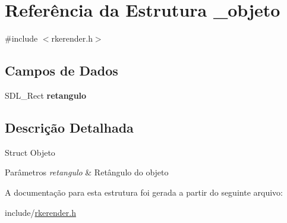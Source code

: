 \hypertarget{struct__objeto}{\section{Referência da Estrutura \-\_\-objeto}
\label{struct__objeto}
}


{\ttfamily \#include $<$rkerender.\-h$>$}

\subsection*{Campos de Dados}
\begin{DoxyCompactItemize}
\item 
\hypertarget{struct__objeto_a66706353d918fc22d4b7130ef5a9fbc4}{S\-D\-L\-\_\-\-Rect {\bfseries retangulo}}\label{struct__objeto_a66706353d918fc22d4b7130ef5a9fbc4}

\end{DoxyCompactItemize}


\subsection{Descrição Detalhada}
Struct Objeto 
\begin{DoxyParams}{Parâmetros}
{\em retangulo} & Retângulo do objeto \\
\hline
\end{DoxyParams}


A documentação para esta estrutura foi gerada a partir do seguinte arquivo\-:\begin{DoxyCompactItemize}
\item 
include/\hyperlink{rkerender_8h}{rkerender.\-h}\end{DoxyCompactItemize}
